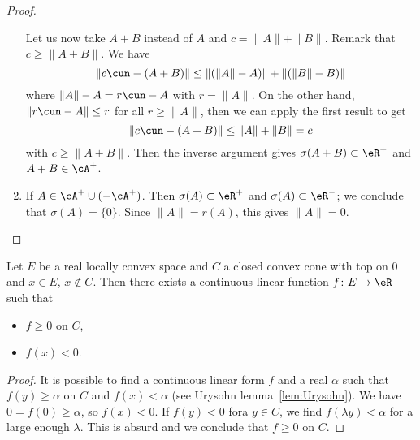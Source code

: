 \begin{proof}
\begin{enumerate}
		      Let us now take $A+B$ instead of $A$ and $c=\| A \|+\| B \|$. Remark that $c\geq \| A+B \|$. We have
		      \[
			      \| c\cun-(A+B) \|\leq\| (\| A \|-A) \|+\| (\| B \|-B) \|
		      \]
		      where $\| A \|-A=r\cun-A$ with $r=\| A \|$. On the other hand, $\| r\cun-A \|\leq r$ for all $r\geq\| A \|$, then we can apply the first result to get
		      \[
			      \| c\cun-(A+B) \|\leq \| A \|+\| B \|=c
		      \]
		      with $c\geq \| A+B \|$. Then the inverse argument gives $\sigma(A+B)\subset\eR^+$ and $A+B\in\cA^+$.

		\item

		      If $A\in\cA^+\cup (-\cA^+)$. Then $\sigma(A)\subset\eR^+$ and $\sigma(A)\subset\eR^-$; we conclude that $\sigma(A)=\{  0\}$. Since $\| A \|=r(A)$, this gives $\| A \|=0$.

	\end{enumerate}
\end{proof}


\begin{proposition}
	Let $E$ be a real locally convex space and $C$ a closed convex cone with top on $0$ and $x\in E$, $x\notin C$. Then there exists a continuous linear function $f\colon E\to \eR$ such that
	\begin{itemize}
		\item $f\geq 0$ on $C$,
		\item $f(x)<0$.
	\end{itemize}

\end{proposition}

\begin{proof}
	It is possible to find a continuous linear form $f$ and a real $\alpha$ such that $f(y)\geq\alpha$ on $C$ and $f(x)<\alpha$ (see Urysohn lemma~\ref{lem:Urysohn}). We have $0=f(0)\geq\alpha$, so $f(x)<0$. If $f(y)<0$ fora $y\in C$, we find $f(\lambda y)<\alpha$ for a large enough $\lambda$. This is absurd and we conclude that $f\geq0$ on $C$.
\end{proof}

